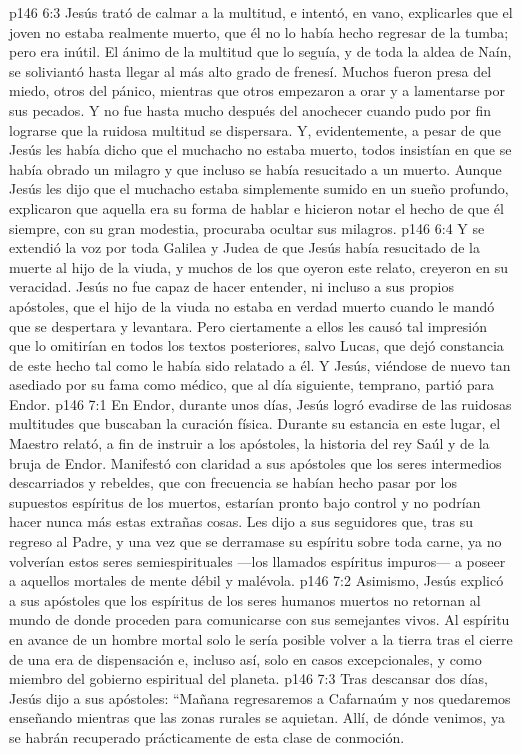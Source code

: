 \vs p146 6:3 Jesús trató de calmar a la multitud, e intentó, en vano, explicarles que el joven no estaba realmente muerto, que él no lo había hecho regresar de la tumba; pero era inútil. El ánimo de la multitud que lo seguía, y de toda la aldea de Naín, se soliviantó hasta llegar al más alto grado de frenesí. Muchos fueron presa del miedo, otros del pánico, mientras que otros empezaron a orar y a lamentarse por sus pecados. Y no fue hasta mucho después del anochecer cuando pudo por fin lograrse que la ruidosa multitud se dispersara. Y, evidentemente, a pesar de que Jesús les había dicho que el muchacho no estaba muerto, todos insistían en que se había obrado un milagro y que incluso se había resucitado a un muerto. Aunque Jesús les dijo que el muchacho estaba simplemente sumido en un sueño profundo, explicaron que aquella era su forma de hablar e hicieron notar el hecho de que él siempre, con su gran modestia, procuraba ocultar sus milagros.
\vs p146 6:4 Y se extendió la voz por toda Galilea y Judea de que Jesús había resucitado de la muerte al hijo de la viuda, y muchos de los que oyeron este relato, creyeron en su veracidad. Jesús no fue capaz de hacer entender, ni incluso a sus propios apóstoles, que el hijo de la viuda no estaba en verdad muerto cuando le mandó que se despertara y levantara. Pero ciertamente a ellos les causó tal impresión que lo omitirían en todos los textos posteriores, salvo Lucas, que dejó constancia de este hecho tal como le había sido relatado a él. Y Jesús, viéndose de nuevo tan asediado por su fama como médico, que al día siguiente, temprano, partió para Endor.
\vs p146 7:1 En Endor, durante unos días, Jesús logró evadirse de las ruidosas multitudes que buscaban la curación física. Durante su estancia en este lugar, el Maestro relató, a fin de instruir a los apóstoles, la historia del rey Saúl y de la bruja de Endor. Manifestó con claridad a sus apóstoles que los seres intermedios descarriados y rebeldes, que con frecuencia se habían hecho pasar por los supuestos espíritus de los muertos, estarían pronto bajo control y no podrían hacer nunca más estas extrañas cosas. Les dijo a sus seguidores que, tras su regreso al Padre, y una vez que se derramase su espíritu sobre toda carne, ya no volverían estos seres semiespirituales ---los llamados espíritus impuros--- a poseer a aquellos mortales de mente débil y malévola.
\vs p146 7:2 Asimismo, Jesús explicó a sus apóstoles que los espíritus de los seres humanos muertos no retornan al mundo de donde proceden para comunicarse con sus semejantes vivos. Al espíritu en avance de un hombre mortal solo le sería posible volver a la tierra tras el cierre de una era de dispensación e, incluso así, solo en casos excepcionales, y como miembro del gobierno espiritual del planeta.
\vs p146 7:3 Tras descansar dos días, Jesús dijo a sus apóstoles: “Mañana regresaremos a Cafarnaúm y nos quedaremos enseñando mientras que las zonas rurales se aquietan. Allí, de dónde venimos, ya se habrán recuperado prácticamente de esta clase de conmoción.
